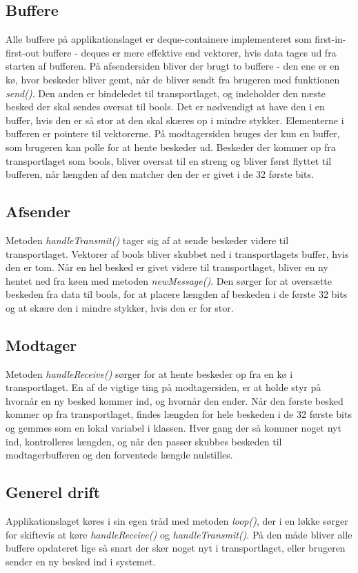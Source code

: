 \subsection{Buffere}
Alle buffere på applikationslaget er deque-containere implementeret som first-in-first-out buffere - deques er mere effektive end vektorer, hvis data tages ud fra starten af bufferen. På afsendersiden bliver der brugt to buffere - den ene er en kø, hvor beskeder bliver gemt, når de bliver sendt fra brugeren med funktionen \textit{send()}. Den anden er bindeledet til transportlaget, og indeholder den næste besked der skal sendes oversat til bools. Det er nødvendigt at have den i en buffer, hvis den er så stor at den skal skæres op i mindre stykker. Elementerne i bufferen er pointere til vektorerne. På modtagersiden bruges der kun en buffer, som brugeren kan polle for at hente beskeder ud. Beskeder der kommer op fra transportlaget som bools, bliver oversat til en streng og bliver først flyttet til bufferen, når længden af den matcher den der er givet i de 32 første bits.

\subsection{Afsender}
Metoden \textit{handleTransmit()} tager sig af at sende beskeder videre til transportlaget. Vektorer af bools bliver skubbet ned i transportlagets buffer, hvis den er tom. Når en hel besked er givet videre til transportlaget, bliver en ny hentet ned fra køen med metoden \textit{newMessage()}. Den sørger for at oversætte beskeden fra data til bools, for at placere længden af beskeden i de første 32 bits og at skære den i mindre stykker, hvis den er for stor.

\subsection{Modtager}
Metoden \textit{handleReceive()} sørger for at hente beskeder op fra en kø i transportlaget. En af de vigtige ting på modtagersiden, er at holde styr på hvornår en ny besked kommer ind, og hvornår den ender. Når den første besked kommer op fra transportlaget, findes længden for hele beskeden i de 32 første bits og gemmes som en lokal variabel i klassen. Hver gang der så kommer noget nyt ind, kontrolleres længden, og når den passer skubbes beskeden til modtagerbufferen og den forventede længde nulstilles. 

\subsection{Generel drift}
Applikationslaget køres i sin egen tråd med metoden \textit{loop()}, der i en løkke sørger for skiftevis at køre \textit{handleReceive()} og \textit{handleTransmit()}. På den måde bliver alle buffere opdateret lige så snart  der sker noget nyt i transportlaget, eller brugeren sender en ny besked ind i systemet.